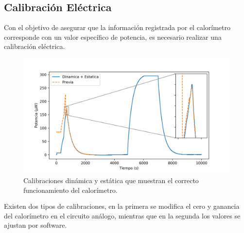 \documentclass[a0]{sciposter}
\newcommand{\figwidth}{0.7\linewidth}
\begin{document}
\begin{multicols}{3}
\section{Calibraci\'on El\'ectrica}
	Con el objetivo de asegurar que la información registrada por el calorímetro corresponde con un valor específico de potencia, es necesario realizar una calibración eléctrica.
	\begin{figure}[h]
		\centering
		\includegraphics[width=\figwidth]{../Data/ElectricalCalibrations/Both}
		\caption{Calibraciones dinámica y estática que muestran el correcto funcionamiento del calorímetro.}
	\end{figure}

	Existen dos tipos de calibraciones, en la primera se modifica el cero y ganancia del calorímetro en el circuito análogo, mientras que en la segunda los valores se ajustan por software. 


\end{multicols}
\end{document}
